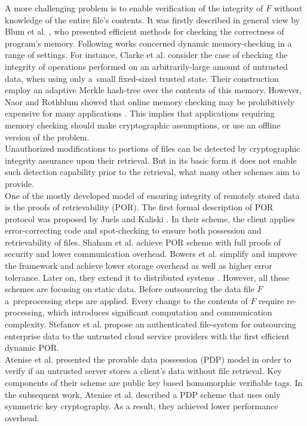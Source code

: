 A more challenging problem is to enable verification of the integrity of $F$
without knowledge of the entire file's contents. It was firstly described in
general view by Blum et al. \cite{memory-correctness}, who presented efficient
methods for checking the correctness of program's memory. Following works
concerned dynamic memory-checking in a range of settings. For instance, Clarke
et al. \cite{clarke} consider the case of checking the integrity of operations
performed on an arbitrarily-large amount of untrusted data, when using only 
a~small fixed-sized trusted state. Their construction employ an adaptive
Merkle hash-tree over the contents of this memory. However, Naor and Rothblum
showed that online memory checking may be prohibitively expensive for many
applications \cite{omc-complexity}. This implies that applications requiring
memory checking should make cryptographic assumptions, or use an offline
version of the problem.\\

Unauthorized modifications to portions of files can be detected by
cryptographic integrity assurance upon their retrieval. But in its basic form
it does not enable such detection capability prior to the retrieval, what many
other schemes aim to provide.\\

One of the mostly developed model of ensuring integrity of remotely stored data
is the proofs of retrievability (POR). The first formal description of POR
protocol was proposed by Juels and Kaliski \cite{por}. In their scheme,
the client applies error-correcting code and spot-checking to ensure both
possession and retrievability of files. Shaham et al. \cite{compact-por}
achieve POR scheme with full proofs of security and lower communication
overhead. Bowers et al. \cite{por2} simplify and improve the framework and
achieve lower storage overhead as well as higher error tolerance. Later on, 
they extend it to distributed systems \cite{hail}. However, all these schemes
are focusing on static data. Before outsourcing the data file $F$ 
a~preprocessing steps are applied. Every change to the contents of $F$ require
re-processing, which introduces significant computation and communication
complexity. Stefanov et al. \cite{iris} propose an authenticated file-system
for outsourcing enterprise data to the untrusted cloud service providers with
the first efficient dynamic POR.\\

Atenise et al. \cite{pdp} presented the provable data possession (PDP) model
in order to verify if an untrusted server stores a client's data without file
retrieval. Key components of their scheme are public key based homomorphic
verifiable tags. In the subsequent work, Atenise et al. \cite{pdp2} described
a PDP scheme that uses only symmetric key cryptography. As a result, they
achieved lower performance overhead.\\

